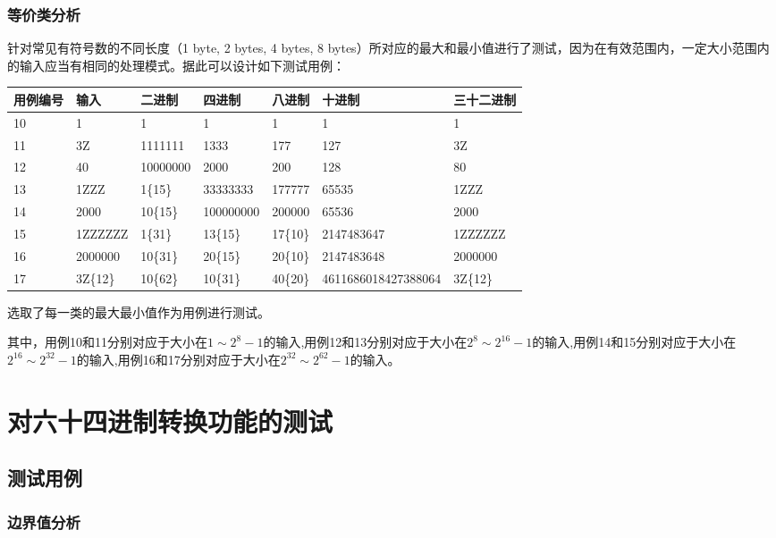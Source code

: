 \documentclass[12pt, a4paper, oneside]{ctexart}
\begin{document}
\subsubsection{等价类分析}

针对常见有符号数的不同长度（1 byte, 2 bytes, 4 bytes, 8 bytes）所对应的最大和最小值进行了测试，因为在有效范围内，一定大小范围内的输入应当有相同的处理模式。据此可以设计如下测试用例：

\begin{table}[!h]
    \small
    \begin{tabular}{|l|l|l|l|l|l|l|}
    \hline
    用例编号 & 输入 & 二进制 & 四进制 & 八进制 & 十进制 & 三十二进制\\ \hline
    10 & 1 & 1 & 1 & 1 & 1 & 1 \\ \hline
    11 & 3Z & 1111111 & 1333 & 177 & 127 & 3Z \\ \hline
    12 & 40 & 10000000 & 2000 & 200 & 128 & 80 \\ \hline
    13 & 1ZZZ & 1\{15\} & 33333333 & 177777 & 65535 & 1ZZZ \\ \hline
    14 & 2000 & 10\{15\} & 100000000 & 200000 & 65536 & 2000 \\ \hline
    15 & 1ZZZZZZ & 1\{31\} & 13\{15\} & 17\{10\} & 2147483647 & 1ZZZZZZ \\ \hline
    16 & 2000000 & 10\{31\} & 20\{15\} & 20\{10\} & 2147483648 & 2000000 \\ \hline
    17 & 3Z\{12\} & 10\{62\} & 10\{31\} & 40\{20\} & 4611686018427388064 & 3Z\{12\} \\ \hline
    \end{tabular}
\end{table}
选取了每一类的最大最小值作为用例进行测试。

其中，用例10和11分别对应于大小在$1\sim2^{8}-1$的输入,用例12和13分别对应于大小在$2^{8}\sim2^{16}-1$的输入,用例14和15分别对应于大小在$2^{16}\sim2^{32}-1$的输入,用例16和17分别对应于大小在$2^{32}\sim2^{62}-1$的输入。

\section{对六十四进制转换功能的测试}

\subsection{测试用例}

\subsubsection{边界值分析}
\end{document}
